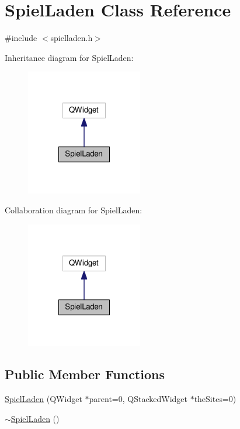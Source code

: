 \hypertarget{classSpielLaden}{\section{Spiel\-Laden Class Reference}
\label{classSpielLaden}
}


{\ttfamily \#include $<$spielladen.\-h$>$}



Inheritance diagram for Spiel\-Laden\-:\nopagebreak
\begin{figure}[H]
\begin{center}
\leavevmode
\includegraphics[width=144pt]{classSpielLaden__inherit__graph}
\end{center}
\end{figure}


Collaboration diagram for Spiel\-Laden\-:\nopagebreak
\begin{figure}[H]
\begin{center}
\leavevmode
\includegraphics[width=144pt]{classSpielLaden__coll__graph}
\end{center}
\end{figure}
\subsection*{Public Member Functions}
\begin{DoxyCompactItemize}
\item 
\hyperlink{classSpielLaden_a6cfe1bcc4deb5c479ca64a3ea17a58fb}{Spiel\-Laden} (Q\-Widget $\ast$parent=0, Q\-Stacked\-Widget $\ast$the\-Sites=0)
\item 
\hyperlink{classSpielLaden_a31a23cf68a5c97cec43f29c9d717756f}{$\sim$\-Spiel\-Laden} ()
\end{DoxyCompactItemize}


